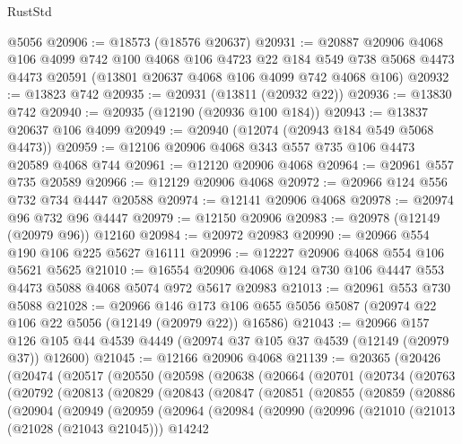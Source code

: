 \begin{lexlean}{RustStd}
\begin{coremodule}
    @5056
@20906 := @18573 (@18576 @20637)
@20931 := @20887
    @20906
    @4068
    @106
    @4099
    @742
    @100
    @4068
    @106
    @4723
    @22
    @184
    @549
    @738
    @5068
    @4473
    @4473
    @20591
    (@13801 @20637 @4068 @106 @4099 @742 @4068 @106)
@20932 := @13823 @742
@20935 := @20931 (@13811 (@20932 @22))
@20936 := @13830 @742
@20940 := @20935 (@12190 (@20936 @100 @184))
@20943 := @13837 @20637 @106 @4099
@20949 := @20940 (@12074 (@20943 @184 @549 @5068 @4473))
@20959 := @12106 @20906 @4068 @343 @557 @735 @106 @4473 @20589 @4068 @744
@20961 := @12120 @20906 @4068
@20964 := @20961 @557 @735 @20589
@20966 := @12129 @20906 @4068
@20972 := @20966 @124 @556 @732 @734 @4447 @20588
@20974 := @12141 @20906 @4068
@20978 := @20974 @96 @732 @96 @4447
@20979 := @12150 @20906
@20983 := @20978 (@12149 (@20979 @96)) @12160
@20984 := @20972 @20983
@20990 := @20966 @554 @190 @106 @225 @5627 @16111
@20996 := @12227 @20906 @4068 @554 @106 @5621 @5625
@21010 := @16554 @20906 @4068 @124 @730 @106 @4447 @553 @4473 @5088 @4068 @5074 @972 @5617 @20983
@21013 := @20961 @553 @730 @5088
@21028 := @20966
    @146
    @173
    @106
    @655
    @5056
    @5087
    (@20974 @22 @106 @22 @5056 (@12149 (@20979 @22)) @16586)
@21043 := @20966
    @157
    @126
    @105
    @44
    @4539
    @4449
    (@20974 @37 @105 @37 @4539 (@12149 (@20979 @37)) @12600)
@21045 := @12166 @20906 @4068
@21139 := @20365
    (@20426
      (@20474
        (@20517
          (@20550
            (@20598
              (@20638
                (@20664
                  (@20701
                    (@20734
                      (@20763
                        (@20792
                          (@20813
                            (@20829
                              (@20843
                                (@20847
                                  (@20851
                                    (@20855
                                      (@20859
                                        (@20886
                                          (@20904
                                            (@20949
                                              (@20959
                                                (@20964
                                                  (@20984
                                                    (@20990
                                                      (@20996
                                                        (@21010
                                                          (@21013 (@21028 (@21043 @21045)))
                                                          @14242

\end{coremodule}
\end{lexlean}
